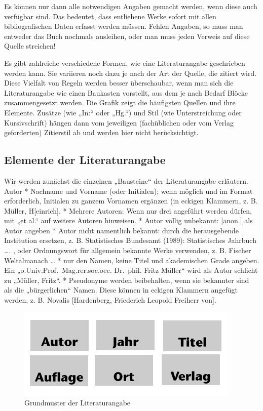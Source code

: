 \documentclass[]{book}
\theoremstyle{definition}
\theoremstyle{definition}
\theoremstyle{definition}
\theoremstyle{remark}
\begin{document}
Es können nur dann alle notwendigen Angaben gemacht werden, wenn diese
auch verfügbar sind. Das bedeutet, dass entliehene Werke sofort mit
allen bibliografischen Daten erfasst werden müssen. Fehlen Angaben, so
muss man entweder das Buch nochmals ausleihen, oder man muss jeden
Verweis auf diese Quelle streichen!

Es gibt zahlreiche verschiedene Formen, wie eine Literaturangabe
geschrieben werden kann. Sie variieren noch dazu je nach der Art der
Quelle, die zitiert wird. Diese Vielfalt von Regeln werden besser
überschaubar, wenn man sich die Literaturangabe wie einen Baukasten
vorstellt, aus dem je nach Bedarf Blöcke zusammengesetzt werden. Die
Grafik zeigt die häufigsten Quellen und ihre Elemente. Zusätze (wie
„In:`` oder „Hg.``) und Stil (wie Unterstreichung oder Kursivschrift)
hängen dann vom jeweiligen (fachüblichen oder vom Verlag geforderten)
Zitierstil ab und werden hier nicht berücksichtigt.

\subsection{Elemente der
Literaturangabe}\label{elemente-der-literaturangabe}

Wir werden zunächst die einzelnen „Bausteine`` der Literaturangabe
erläutern. Autor * Nachname und Vorname (oder Initialen); wenn möglich
und im Format erforderlich, Initialen zu ganzem Vornamen ergänzen (in
eckigen Klammern, z. B. Müller, H{[}einrich{]}. * Mehrere Autoren: Wenn
nur drei angeführt werden dürfen, mit „et al.`` auf weitere Autoren
hinweisen. * Autor völlig unbekannt: {[}anon.{]} als Autor angeben *
Autor nicht namentlich bekannt: durch die herausgebende Institution
ersetzen, z. B. Statistisches Bundesamt (1989): Statistisches Jahrbuch
\ldots{}. , oder Ordnungswort für allgemein bekannte Werke verwenden, z.
B. Fischer Weltalmanach \ldots{} * nur den Namen, keine Titel und
akademischen Grade angeben. Ein „o.Univ.Prof.~Mag.rer.soc.oec. Dr.~phil.
Fritz Müller`` wird als Autor schlicht zu „Müller, Fritz``. * Pseudonyme
werden beibehalten, wenn sie bekannter sind als die „bürgerlichen``
Namen. Diese können in eckigen Klammern angefügt werden, z. B. Novalis
{[}Hardenberg, Friederich Leopold Freiherr von{]}.

\begin{figure}

{\centering \includegraphics{images/zitieren-buch-min} 

}

\caption{Grundmuster der Literaturangabe}\label{fig:unnamed-chunk-24}
\end{figure}
\end{document}
